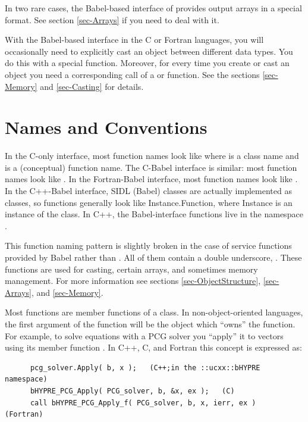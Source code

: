 In two rare cases, the Babel-based interface of \hypre{} provides
output arrays in a special format.  See section \ref{sec-Arrays}
if you need to deal with it.

With the Babel-based interface in the C or Fortran languages, you will
occasionally need to explicitly cast an object between different data
types.  You do this with a special  function.  Moreover,
for every time you create or cast an object you need a corresponding
call of a  or  function. See the
sections \ref{sec-Memory} and \ref{sec-Casting} for details.


\section{Names and Conventions}
\label{sec-Names-Conventions}

In the C-only interface, most \hypre{} function names look like
 where  is a class name and
 is a (conceptual) function name.  The C-Babel
interface is similar: most function names look like
.  In the Fortran-Babel interface, most
function names look like .  In the
C++-Babel interface, SIDL (Babel) classes are actually implemented as
classes, so functions generally look like Instance.Function, where
Instance is an instance of the class.  In C++, the
Babel-interface functions live in the namespace .

This function naming pattern is slightly broken in the case of service
functions provided by Babel rather than \hypre{}.  All of them contain
a double underscore, \code{__}.  These functions are used for casting,
certain arrays, and sometimes memory management.  For more information
see sections \ref{sec-ObjectStructure}, \ref{sec-Arrays}, and
\ref{sec-Memory}.

Most functions are member functions of a class.  In
non-object-oriented languages, the first argument of the function will
be the object which ``owns'' the function.  For example, to solve
equations with a PCG solver you ``apply'' it to vectors using its
member function .  In C++, C, and Fortran this concept is
expressed as:
\begin{verbatim}
      pcg_solver.Apply( b, x );   (C++;in the ::ucxx::bHYPRE namespace)
      bHYPRE_PCG_Apply( PCG_solver, b, &x, ex );   (C)
      call bHYPRE_PCG_Apply_f( PCG_solver, b, x, ierr, ex )   (Fortran)
\end{verbatim}

